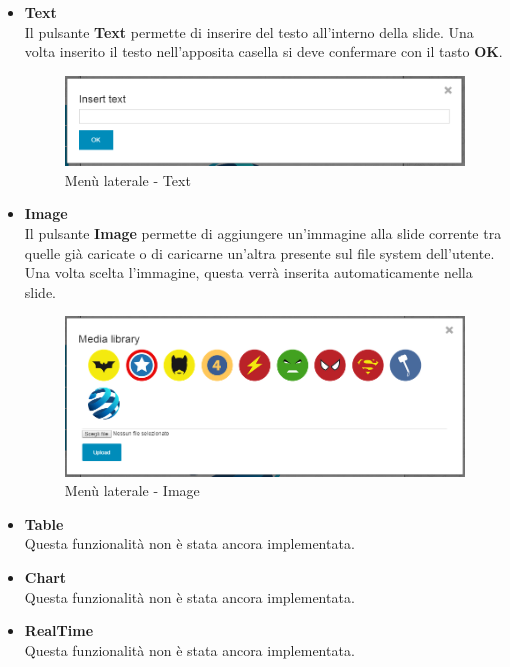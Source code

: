 \begin{itemize}
 \item \textbf{Text}\\
    Il pulsante \textbf{Text} permette di inserire del testo all'interno della slide. Una volta inserito il testo nell'apposita casella si deve confermare con il tasto \textbf{OK}.
    \begin{figure}[H] 
	\centering 
	\includegraphics[scale=0.40] {img/editor_text.png}
	\caption{Menù laterale - Text} 
    \end{figure}
    
    
 \item \textbf{Image}\\
    Il pulsante \textbf{Image} permette di aggiungere un'immagine alla slide corrente tra quelle già caricate o di caricarne un'altra presente sul file system dell'utente. Una volta scelta l'immagine, questa verrà inserita automaticamente nella slide.
   \begin{figure}[H] 
	\centering 
	\includegraphics[scale=0.40] {img/editor_img.png}
	\caption{Menù laterale - Image} 
    \end{figure}

  \item \textbf{Table}\\
  Questa funzionalità non è stata ancora implementata.
  
  \item \textbf{Chart}\\
  Questa funzionalità non è stata ancora implementata.
  
  \item \textbf{RealTime}\\
  Questa funzionalità non è stata ancora implementata.



\end{itemize}
